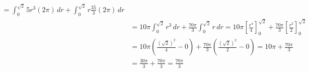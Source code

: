 \documentclass[10pt,letterpaper,fleqn]{article}
\begin{document}
\begin{enumerate}
\begin{equation*}
\begin{split}
                        = \int_0^{\sqrt{2}}{5r^3 (2\pi) }\,d r + \int_0^{\sqrt{2}}{ r \frac{35}{3} (2\pi)}\,d r
                        \\& = 10\pi \int_0^{\sqrt{2}}{r^3 }\,d r + 
                        \frac{70\pi}{3} \int_0^{\sqrt{2}}{r}\,d r
                        = 10\pi \left[\frac{r^4}{4}\right]_0^{\sqrt{2}} + \frac{70\pi}{3} \left[\frac{r^2}{2}\right]_0^{\sqrt{2}}
                        \\& = 10\pi (\frac{(\sqrt{2})^2}{4} - 0) + 
                        \frac{70\pi}{3} (\frac{(\sqrt{2})^2}{2}-0)
                        = 10\pi + \frac{70\pi}{3}
                        \\& = \frac{30\pi}{3} + \frac{70\pi}{3} 
                        = \frac{70\pi}{3}
                \end{split}
                \end{equation*}


\end{enumerate}
\end{document}
